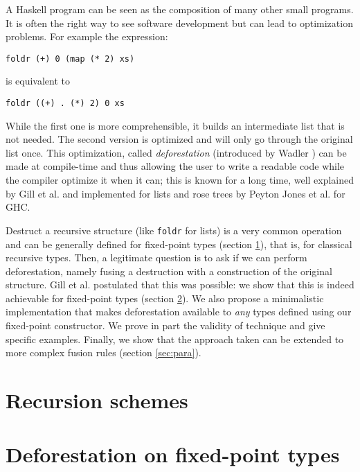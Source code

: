 \documentclass[format=sigplan, review=true, anonymous=true]{acmart}
\newcommand{\hs}[1]{\texttt{#1}}
\begin{document}
A Haskell program can be seen as the composition of many other small programs. It is often the right way to see software development but can lead to optimization problems. For example the expression:
\begin{verbatim}
foldr (+) 0 (map (* 2) xs)
\end{verbatim}
is equivalent to
\begin{verbatim}
foldr ((+) . (*) 2) 0 xs
\end{verbatim}

\noindent While the first one is more comprehensible, it builds an intermediate list that is not needed. The second version is optimized and will only go through the original list once.
This optimization, called \emph{deforestation} (introduced by Wadler \cite{WADLER1990231}) can be made at compile-time and thus allowing the user to write a readable code while the compiler optimize it when it can; this is known for a long time, well explained by Gill et al. \cite{Gill:1993:SCD:165180.165214} and implemented for lists and rose trees by Peyton Jones et al. \cite{pbr} for GHC.

Destruct a recursive structure (like \hs{foldr} for lists) is a very common operation and can be generally defined for fixed-point types (section \ref{sec:recschemes}), that is, for classical recursive types. Then, a legitimate question is to ask if we can perform deforestation, namely fusing a destruction with a construction of the original structure. Gill et al. \cite{Gill:1993:SCD:165180.165214} postulated that this was possible: we show that this is indeed achievable for fixed-point types (section \ref{sec:rectypes}). We also propose a minimalistic implementation that makes deforestation available to \emph{any} types defined using our fixed-point constructor. We prove in part the validity of technique and give specific examples.
Finally, we show that the approach taken can be extended to more complex fusion rules (section \ref{sec:para}).

\section{Recursion schemes}
\label{sec:recschemes}


\section{Deforestation on fixed-point types}
\label{sec:rectypes}

\end{document}
